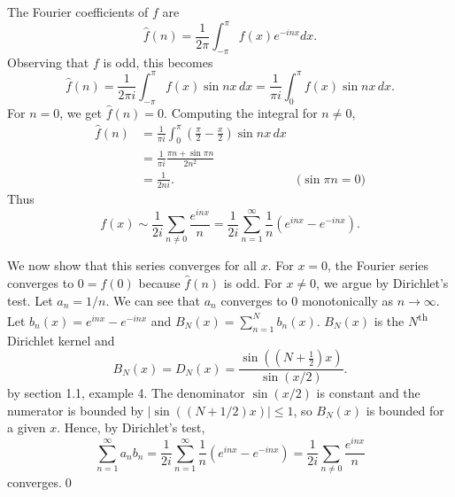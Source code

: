 \documentclass[oneside]{article}
\newcommand\abs[1]{\left|#1\right|}
\begin{document}
  The Fourier coefficients of $f$ are\[
    \hat f(n) = \frac{1}{2\pi}\int_{-\pi}^\pi f(x) e^{-inx} dx\text{.}
  \] Observing that $f$ is odd, this becomes\[
    \hat f(n) = \frac{1}{2\pi i}\int_{-\pi}^\pi f(x) \sin nx\,dx
    = \frac{1}{\pi i}\int_0^\pi f(x) \sin nx\,dx \text{.}
  \] For $n=0$, we get $\hat f(n) = 0$. Computing the integral for $n \neq 0$,
  \begin{align*}
    \hat f(n)
    &= \frac{1}{\pi i}\int_0^\pi\left(\frac\pi2-\frac x2\right)\sin nx\,dx \\
    &= \frac{1}{\pi i}\frac{\pi n + \sin \pi n}{2n^2} \\
    &= \frac{1}{2ni}\text{.} &\text{($\sin\pi n = 0$)}
  \end{align*} Thus\[
    f(x) \sim \frac{1}{2i}\sum_{n\neq0} \frac{e^{inx}}{n}
    = \frac{1}{2i} \sum_{n=1}^\infty \frac1n\left(e^{inx} - e^{-inx}\right)
    \text{.}
  \]

  We now show that this series converges for all $x$. For $x=0$, the Fourier
  series converges to $0 = f(0)$ because $\hat f(n)$ is odd. For $x\neq 0$, we
  argue by Dirichlet's test. Let $a_n = 1/n$. We can see that $a_n$ converges to
  $0$ monotonically as $n\to\infty$. Let $b_n(x) = e^{inx} - e^{-inx}$ and
  $B_N(x) = \sum_{n=1}^N b_n(x)$. $B_N(x)$ is the $N$\textsuperscript{th}
  Dirichlet kernel and\[
    B_N(x) = D_N(x) = \frac{\sin((N+\frac12)x)}{\sin(x/2)}\text{.}
  \] by section 1.1, example 4. The denominator $\sin(x/2)$ is constant and the
  numerator is bounded by $\abs{\sin((N+1/2)x)} \leq 1$, so $B_N(x)$ is bounded
  for a given $x$. Hence, by Dirichlet's test,\[
    \sum_{n=1}^\infty a_nb_n
    = \frac{1}{2i} \sum_{n=1}^\infty \frac1n\left(e^{inx} - e^{-inx}\right)
    = \frac{1}{2i}\sum_{n\neq0} \frac{e^{inx}}{n}
  \] converges.\qed
\end{document}
